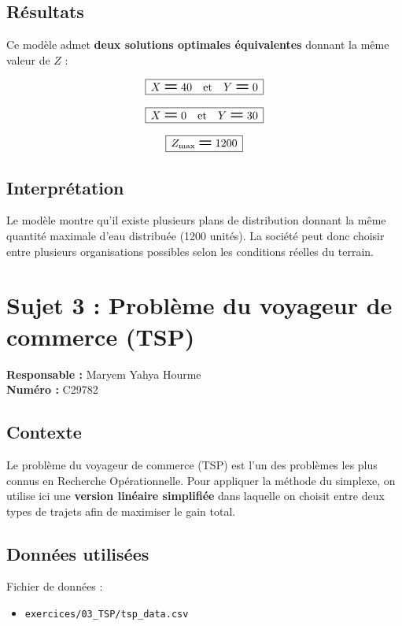 \documentclass[12pt,a4paper]{article}
\newcommand{\Eq}{\mathrel{\text{\Large\bfseries =}}}
\newcommand{\BoxedEq}[1]{%
  \begin{equation*}
    \boxed{\,\displaystyle #1\,}
  \end{equation*}%
}
\begin{document}
\subsection{Résultats}

Ce modèle admet \textbf{deux solutions optimales équivalentes} donnant la même valeur de \(Z\) :

\BoxedEq{X \Eq 40 \quad\text{et}\quad Y \Eq 0}

\BoxedEq{X \Eq 0 \quad\text{et}\quad Y \Eq 30}

\BoxedEq{Z_{\mathrm{max}} \Eq 1200}

\subsection{Interprétation}

Le modèle montre qu'il existe plusieurs plans de distribution donnant la même quantité maximale d'eau distribuée (1200 unités). La société peut donc choisir entre plusieurs organisations possibles selon les conditions réelles du terrain.

\section{Sujet 3 : Problème du voyageur de commerce (TSP)}

\begin{responsable}
\textbf{Responsable :} Maryem Yahya Hourme \\
\textbf{Numéro :} C29782
\end{responsable}

\subsection{Contexte}

Le problème du voyageur de commerce (TSP) est l'un des problèmes les plus connus en Recherche Opérationnelle. Pour appliquer la méthode du simplexe, on utilise ici une \textbf{version linéaire simplifiée} dans laquelle on choisit entre deux types de trajets afin de maximiser le gain total.

\subsection{Données utilisées}
Fichier de données :
\begin{itemize}
    \item \texttt{exercices/03\_TSP/tsp\_data.csv}
\end{itemize}
\end{document}
